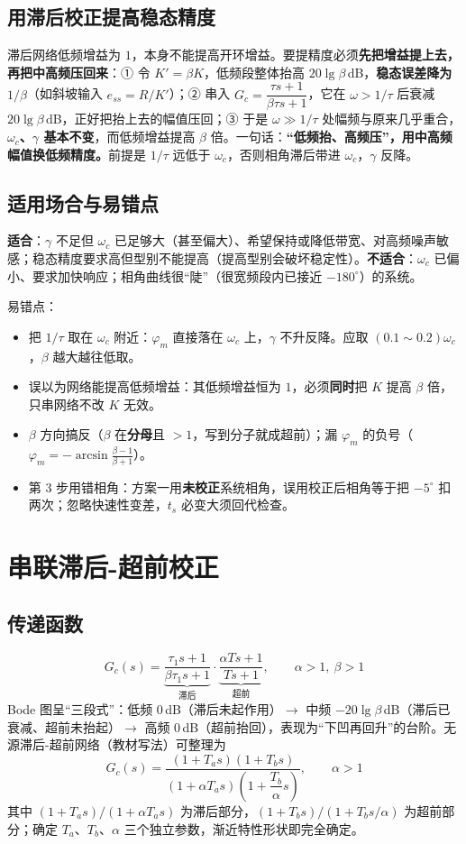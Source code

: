 \subsection{用滞后校正提高稳态精度}
滞后网络低频增益为 $1$，本身不能提高开环增益。要提精度必须\textbf{先把增益提上去，再把中高频压回来}：① 令 $K'=\beta K$，低频段整体抬高 $20\lg\beta$\,dB，\textbf{稳态误差降为 $1/\beta$}（如斜坡输入 $e_{ss}=R/K'$）；② 串入 $G_c=\dfrac{\tau s+1}{\beta\tau s+1}$，它在 $\omega>1/\tau$ 后衰减 $20\lg\beta$\,dB，正好把抬上去的幅值压回；③ 于是 $\omega\gg1/\tau$ 处幅频与原来几乎重合，\textbf{$\omega_c$、$\gamma$ 基本不变}，而低频增益提高 $\beta$ 倍。一句话：\textbf{“低频抬、高频压”，用中高频幅值换低频精度。}前提是 $1/\tau$ 远低于 $\omega_c$，否则相角滞后带进 $\omega_c$，$\gamma$ 反降。

\subsection{适用场合与易错点}
\textbf{适合}：$\gamma$ 不足但 $\omega_c$ 已足够大（甚至偏大）、希望保持或降低带宽、对高频噪声敏感；稳态精度要求高但型别不能提高（提高型别会破坏稳定性）。\textbf{不适合}：$\omega_c$ 已偏小、要求加快响应；相角曲线很“陡”（很宽频段内已接近 $-180^\circ$）的系统。

易错点：
\begin{itemize}
    \item 把 $1/\tau$ 取在 $\omega_c$ 附近：$\varphi_m$ 直接落在 $\omega_c$ 上，$\gamma$ 不升反降。应取 $(0.1\sim0.2)\omega_c$，$\beta$ 越大越往低取。
    \item 误以为网络能提高低频增益：其低频增益恒为 $1$，必须\textbf{同时}把 $K$ 提高 $\beta$ 倍，只串网络不改 $K$ 无效。
    \item $\beta$ 方向搞反（$\beta$ 在\textbf{分母}且 $>1$，写到分子就成超前）；漏 $\varphi_m$ 的负号（$\varphi_m=-\arcsin\frac{\beta-1}{\beta+1}$）。
    \item 第 3 步用错相角：方案一用\textbf{未校正}系统相角，误用校正后相角等于把 $-5^\circ$ 扣两次；忽略快速性变差，$t_s$ 必变大须回代检查。
\end{itemize}

\bigskip

\section{串联滞后-超前校正}

\subsection{传递函数}
\[
\boxed{\ G_c(s)=\underbrace{\frac{\tau_1s+1}{\beta\tau_1s+1}}_{\text{滞后}}\cdot
\underbrace{\frac{\alpha Ts+1}{Ts+1}}_{\text{超前}},\qquad \alpha>1,\ \beta>1\ }
\]
Bode 图呈“三段式”：低频 $0$\,dB（滞后未起作用）$\to$ 中频 $-20\lg\beta$\,dB（滞后已衰减、超前未抬起）$\to$ 高频 $0$\,dB（超前抬回），表现为“下凹再回升”的台阶。无源滞后-超前网络（教材写法）可整理为
\[
G_c(s)=\frac{(1+T_as)(1+T_bs)}{(1+\alpha T_as)\left(1+\dfrac{T_b}{\alpha}s\right)},\qquad \alpha>1
\]
其中 $(1+T_as)/(1+\alpha T_as)$ 为滞后部分，$(1+T_bs)/(1+T_bs/\alpha)$ 为超前部分；确定 $T_a$、$T_b$、$\alpha$ 三个独立参数，渐近特性形状即完全确定。

